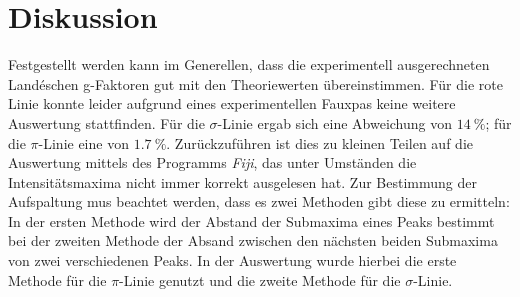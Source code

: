 \section{Diskussion}
Festgestellt werden kann im Generellen, dass die experimentell ausgerechneten Landéschen g-Faktoren gut mit den Theoriewerten übereinstimmen. Für die rote Linie konnte leider aufgrund eines experimentellen Fauxpas keine weitere Auswertung stattfinden.
Für die $\sigma$-Linie ergab sich eine Abweichung von $\SI{14}{\%}$; für die $\pi$-Linie eine von $\SI{1,7}{\%}$. Zurückzuführen ist dies zu kleinen Teilen auf die Auswertung mittels des Programms \textit{Fiji}, das unter Umständen die Intensitätsmaxima nicht immer korrekt ausgelesen hat.
Zur Bestimmung der Aufspaltung mus beachtet werden, dass es zwei Methoden gibt diese zu ermitteln:
In der ersten Methode wird der Abstand der Submaxima eines Peaks bestimmt bei der zweiten Methode der Absand zwischen den nächsten beiden Submaxima von zwei verschiedenen Peaks. In der Auswertung wurde hierbei die erste Methode für die $\pi$-Linie genutzt und die zweite Methode für die $\sigma$-Linie.
